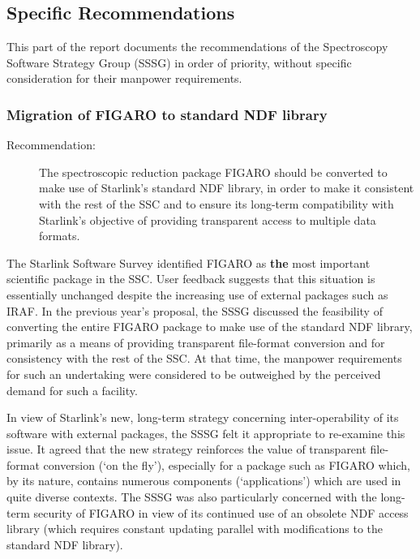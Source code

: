 \subsection{Specific Recommendations}

This part of the report documents the recommendations of the
Spectroscopy Software Strategy Group (SSSG) in order of priority,
without specific consideration for their manpower requirements.

\subsubsection{Migration of FIGARO to standard NDF library}

\begin{description}
\item[Recommendation:]
The spectroscopic reduction package FIGARO should be converted to make
use of Starlink's standard NDF library, in order to make it consistent
with the rest of the SSC and to ensure its long-term compatibility
with Starlink's objective of providing transparent access to multiple
data formats.
\end{description}

The Starlink Software Survey identified FIGARO as {\bf the} most
important scientific package in the SSC.  User feedback suggests that
this situation is essentially unchanged despite the increasing use of
external packages such as IRAF.  In the previous year's proposal, the
SSSG discussed the feasibility of converting the entire FIGARO package
to make use of the standard NDF library, primarily as a means of
providing transparent file-format conversion and for consistency with
the rest of the SSC. At that time, the manpower requirements for such
an undertaking were considered to be outweighed by the perceived
demand for such a facility.

In view of Starlink's new, long-term strategy concerning
inter-operability of its software with external packages, the SSSG
felt it appropriate to re-examine this issue.  It agreed that the new
strategy reinforces the value of transparent file-format conversion
(`on the fly'), especially for a package such as FIGARO which, by its
nature, contains numerous components (`applications') which are used
in quite diverse contexts. The SSSG was also particularly concerned
with the long-term security of FIGARO in view of its continued use of
an obsolete NDF access library (which requires constant updating
parallel with modifications to the standard NDF library).

